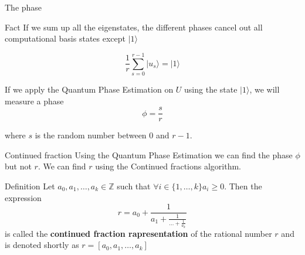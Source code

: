 \documentclass{beamer}
\begin{document}
    \begin{frame}{The phase}
        \begin{alertblock}{Fact}
            If we sum up all the eigenstates, the different phases cancel out all
            computational basis states except $|1\rangle$

            $$ \frac{1}{r} \sum_{s=0}^{r-1}|u_s\rangle = |1\rangle $$
        \end{alertblock}

        If we apply the Quantum Phase Estimation on $U$ using the state $|1\rangle$, we will measure a phase
        $$ \phi = \frac{s}{r}$$

        where $s$ is the random number between $0$ and $r-1$.
    \end{frame}

    \begin{frame}{Continued fraction}
        Using the Quantum Phase Estimation we can find the phase $\phi$ but not $r$.
        We can find $r$ using the Continued fractions algorithm.
        \hspace{1cm}
        \begin{alertblock}{Definition}
            Let $a_0,a_1,\dots,a_k \in \mathbb{Z}$ such that $\forall i \in \{1,\dots,k\} a_i \geq 0$. Then the expression
            $$r = a_0 + \frac{1}{a_1 + \frac{1}{\dots + \frac{1}{a_k}}}$$
            is called the \textbf{continued fraction rapresentation} of the rational number $r$ and is denoted shortly as $r = [a_0,a_1,\dots,a_k]$
        \end{alertblock}
    \end{frame}
\end{document}
